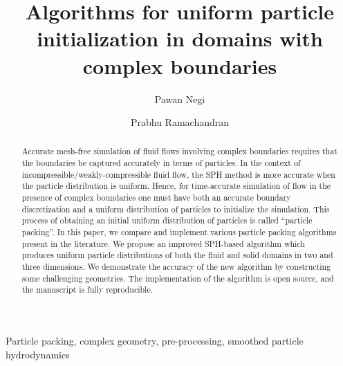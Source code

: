 \documentclass[preprint,12pt]{elsarticle}
\begin{document}
\def\showimages{1}

\begin{frontmatter}

  \title{Algorithms for uniform particle initialization in domains
  with complex boundaries}

  \author[IITB]{Pawan Negi}
  \author[IITB]{Prabhu Ramachandran}
\address[IITB]{Department of Aerospace Engineering, Indian Institute of
  Technology Bombay, Powai, Mumbai 400076}


\begin{abstract}

  Accurate mesh-free simulation of fluid flows involving complex boundaries
  requires that the boundaries be captured accurately in terms of particles.
  In the context of incompressible/weakly-compressible fluid flow, the SPH
  method is more accurate when the particle distribution is uniform. Hence,
  for time-accurate simulation of flow in the presence of complex boundaries
  one must have both an accurate boundary discretization and a uniform
  distribution of particles to initialize the simulation. This process of
  obtaining an initial uniform distribution of particles is called ``particle
  packing''. In this paper, we compare and implement various particle packing
  algorithms present in the literature. We propose an improved SPH-based
  algorithm which produces uniform particle distributions of both the fluid
  and solid domains in two and three dimensions. We demonstrate the accuracy of
  the new algorithm by constructing some challenging geometries. The
  implementation of the algorithm is open source, and the manuscript is fully
  reproducible.
\end{abstract}

\begin{keyword}
{Particle packing}, {complex geometry}, {pre-processing}, {smoothed particle
hydrodynamics}


\end{keyword}

\end{frontmatter}
\end{document}
